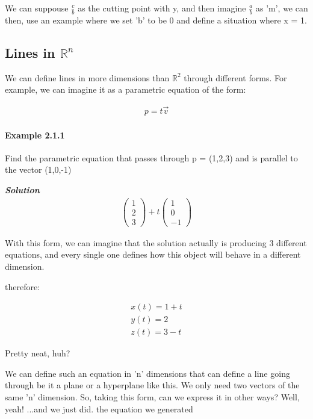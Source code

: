 \documentclass[11pt,fleqn]{book} %
\begin{document}
We can suppouse $\frac{c}{b}$ as the cutting point with y, and then imagine $\frac{a}{b}$ as 'm', we can then, use an example where we set 'b' to be 0
and define a situation where x = 1.

\subsection{Lines in $\mathbb{R}^n$}

We can define lines in more dimensions than $\mathbb{R}^2$
through different forms. For example, we can imagine it as a parametric equation of the form:

\begin{gather}
    p = t\vec{v}
\end{gather}

\paragraph*{Example 2.1.1}

Find the parametric equation that passes through p = (1,2,3) and is parallel to the vector (1,0,-1)

\textit{\textbf{Solution}}
\begin{gather}
    \begin{pmatrix}
        1 \\ 2 \\ 3
    \end{pmatrix} + t \begin{pmatrix}
        1 \\0 \\-1
    \end{pmatrix}
\end{gather}

With this form, we can imagine that the solution actually is producing 3 different equations, and every single one defines how this object will behave in a different dimension.

therefore:

\begin{gather}
    x(t) = 1 + t \\ 
    y(t) = 2 \\
    z(t) = 3-t
\end{gather}

Pretty neat, huh?

We can define such an equation in 'n' dimensions that can define a line going through be it a plane or a hyperplane like this. We only need two vectors of the same 'n' dimension.
So, taking this form, can we express it in other ways? Well, yeah! ...and we just did. 
the equation we generated
\end{document}
